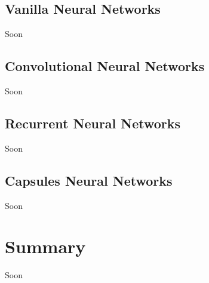 \subsection{Vanilla Neural Networks}\label{sec:3.8.1}
\vspace{-0.5cm}
\noindent Soon


\vspace{-0.3cm}


\subsection{Convolutional Neural Networks}\label{sec:3.8.2}
\vspace{-0.5cm}
\noindent Soon


\vspace{-0.3cm}


\subsection{Recurrent Neural Networks}\label{sec:3.8.3}
\vspace{-0.5cm}
\noindent Soon


\vspace{-0.3cm}

\subsection{Capsules Neural Networks}\label{sec:3.8.4}
\vspace{-0.5cm}
\noindent Soon


\vspace{-0.3cm}




\section{Summary}\label{sec:3.9}
\vspace{-0.5cm}
\noindent Soon

\vspace{-0.3cm}



